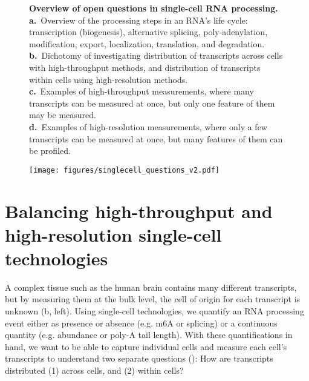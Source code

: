 \clearpage
\thispagestyle{facingcaption}
\begin{figure}[h]
\captionsetup{labelformat=prev-page}
\caption[Overview of open questions in single-cell RNA processing.]{\textbf{Overview of open questions in single-cell RNA processing.}\\
\textbf{a.}~Overview of the processing steps in an RNA's life cycle: transcription (biogenesis), alternative splicing, poly-adenylation, modification, export, localization, translation, and degradation.\\
\textbf{b.}~Dichotomy of investigating distribution of transcripts across cells with high-throughput methods, and distribution of transcripts within cells using high-resolution methods.\\
\textbf{c.}~Examples of high-throughput measurements, where many transcripts can be measured at once, but only one feature of them may be measured.\\
\textbf{d.}~Examples of high-resolution measurements, where only a few transcripts can be measured at once, but many features of them can be profiled.
}
\label{fig:singlecell_questions}
\end{figure}
\clearpage
\begin{figure}[h]
\ContinuedFloat
\captionsetup{labelformat=empty}
\centering
\texttt{[image: figures/singlecell\_questions\_v2.pdf]}
\end{figure}
\clearpage


\section{Balancing high-throughput and high-resolution single-cell technologies}

A complex tissue such as the human brain contains many different transcripts, but by measuring them at the bulk level, the cell of origin for each transcript is unknown (b, left). Using single-cell technologies, we quantify an RNA processing event either as presence or absence (e.g. m6A or splicing) or a continuous quantity (e.g. abundance or poly-A tail length). With these quantifications in hand, we want to be able to capture individual cells and measure each cell's transcripts to understand two separate questions (): How are transcripts distributed (1) across cells, and (2) within cells?

